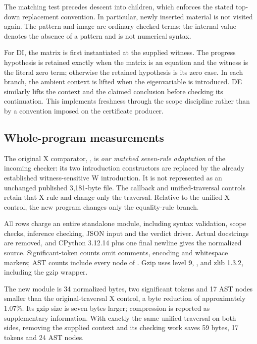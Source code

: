 The matching test precedes descent into children, which enforces the stated
top-down replacement convention. In particular, newly inserted material
is not visited again. The pattern and image are ordinary checked terms;
the internal value  denotes the absence of a pattern and is
not numerical syntax.

For DI, the matrix is first instantiated at the supplied witness. The
progress hypothesis is retained exactly when the matrix is an equation
and the witness is the literal zero term; otherwise the retained
hypothesis is its zero case. In each branch, the ambient context is lifted
when the eigenvariable is introduced. DE similarly lifts the context and
the claimed conclusion before checking its continuation. This implements
freshness through the scope discipline rather than by a convention imposed
on the certificate producer.

\subsection{Whole-program measurements}

The original X comparator, , is
\emph{our matched seven-rule adaptation} of the incoming
 checker: its two introduction constructors are
replaced by the already established witness-sensitive W introduction.
It is not represented as an unchanged published 3,181-byte file. The
callback and unified-traversal controls retain that X rule and change only
the traversal. Relative to the unified X control, the new program changes
only the equality-rule branch.

All rows charge an entire standalone module, including syntax validation,
scope checks, inference checking, JSON input and the verdict driver.
Actual docstrings are removed, and CPython 3.12.14
 plus one final newline gives the normalized source.
Significant-token counts omit comments, encoding and whitespace markers;
AST counts include every node of . Gzip uses level 9,
, and zlib 1.3.2, including the gzip wrapper.

\begin{center}\small

\end{center}

The new module is 34 normalized bytes, two significant tokens and
17 AST nodes smaller than the original-traversal X control, a byte
reduction of approximately $1.07\%$. Its gzip size is seven bytes larger;
compression is reported as supplementary information. With exactly the
same unified traversal on both sides, removing the supplied context and
its checking work saves 59 bytes, 17 tokens and 24 AST nodes.

